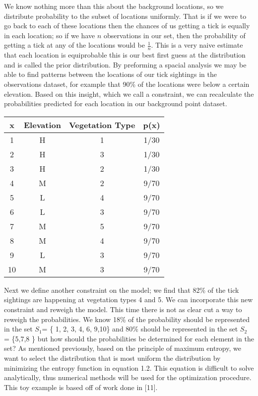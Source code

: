 \noindent We know nothing more than this about the background locations, so we distribute probability to the subset of locations uniformly. That is if we were to go back to each of these locations then the chances of us getting a tick is equally in each location; so if we have $n$ observations in our set, then the probability of getting a tick at any of the locations would be $\frac{1}{n}$. This is a very naive estimate that each location is equiprobable this is our best first guess at the distribution and is called the prior distribution. By preforming a spacial analysis we may be able to find patterns between the locations of our tick sightings in the observations dataset, for example that 90\% of the locations were below a certain elevation. Based on this insight, which we call a constraint, we can recalculate the probabilities predicted for each location in our background point dataset. \newline

\begin{center}
 \begin{tabular}{||c c c c||} 
 \hline
 x & Elevation & Vegetation Type & p(x) \\ [0.5ex] 
 \hline\hline
 1 & H &  1& 1/30 \\ 
 \hline
  2 & H & 3 &  1/30\\
 \hline
   3 & H & 2 &  1/30\\
 \hline
 4 & M & 2 & 9/70  \\
 \hline
  5 & L & 4 & 9/70  \\
 \hline
   6 & L & 3 & 9/70 \\
 \hline
  7 & M & 5 & 9/70 \\
 \hline
   8 & M & 4 &  9/70 \\
 \hline
 9 & L & 3 & 9/70 \\
 \hline
   10 & M & 3 & 9/70\\
 \hline
\end{tabular}
\end{center}

\noindent Next we define another constraint on the model; we find that 82\% of the tick sightings are happening at vegetation types 4 and 5. We can incorporate this new constraint and reweigh the model. This time there is not as clear cut a way to reweigh the probabilities. We know 18\% of the probability should be represented in the set $S_1$= \{ 1, 2, 3, 4, 6, 9,10\} and 80\% should be represented in the set $S_2$ = \{5,7,8 \} but how should the probabilities be determined for each element in the set? As mentioned previously, based on the principle of maximum entropy, we want to select the distribution that is most uniform the distribution by minimizing the entropy function in equation 1.2. This equation is difficult to solve analytically, thus numerical methods will be used for the optimization procedure. This toy example is based off of work done in [11]. \newline

